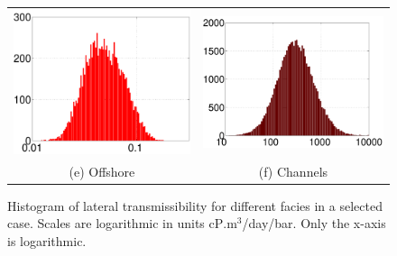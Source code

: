 \begin{figure}
\begin{tabular}{cc}
\includegraphics[width=0.42 \linewidth,natwidth=478bp,natheight=385bp]{./figurer/kxh_5.pdf}&
\includegraphics[width=0.46 \linewidth,natwidth=508bp,natheight=385bp]{./figurer/kxh_6.pdf}\\
(e) Offshore&(f) Channels
\end{tabular}
\caption{Histogram of lateral transmissibility for different facies in a selected case. Scales are logarithmic in units cP$.$m$^3$/day/bar. Only the x-axis is logarithmic.}
\label{fig:kxh}
\end{figure}

